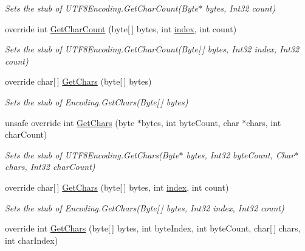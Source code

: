 \begin{DoxyCompactItemize}
\begin{DoxyCompactList}\small\item\em Sets the stub of U\-T\-F8\-Encoding.\-Get\-Char\-Count(\-Byte$\ast$ bytes, Int32 count)\end{DoxyCompactList}\item 
override int \hyperlink{class_system_1_1_text_1_1_fakes_1_1_stub_u_t_f8_encoding_af10ad81b078a4b38a30603140ae9aff4}{Get\-Char\-Count} (byte\mbox{[}$\,$\mbox{]} bytes, int \hyperlink{jquery-1_810_82-vsdoc_8js_a75bb12d1f23302a9eea93a6d89d0193e}{index}, int count)
\begin{DoxyCompactList}\small\item\em Sets the stub of U\-T\-F8\-Encoding.\-Get\-Char\-Count(\-Byte\mbox{[}$\,$\mbox{]} bytes, Int32 index, Int32 count)\end{DoxyCompactList}\item 
override char\mbox{[}$\,$\mbox{]} \hyperlink{class_system_1_1_text_1_1_fakes_1_1_stub_u_t_f8_encoding_ad5cbc984282ace8640a72464634a2d5b}{Get\-Chars} (byte\mbox{[}$\,$\mbox{]} bytes)
\begin{DoxyCompactList}\small\item\em Sets the stub of Encoding.\-Get\-Chars(\-Byte\mbox{[}$\,$\mbox{]} bytes)\end{DoxyCompactList}\item 
unsafe override int \hyperlink{class_system_1_1_text_1_1_fakes_1_1_stub_u_t_f8_encoding_a55f956660620b1ca922c4e45c2a1cc75}{Get\-Chars} (byte $\ast$bytes, int byte\-Count, char $\ast$chars, int char\-Count)
\begin{DoxyCompactList}\small\item\em Sets the stub of U\-T\-F8\-Encoding.\-Get\-Chars(\-Byte$\ast$ bytes, Int32 byte\-Count, Char$\ast$ chars, Int32 char\-Count)\end{DoxyCompactList}\item 
override char\mbox{[}$\,$\mbox{]} \hyperlink{class_system_1_1_text_1_1_fakes_1_1_stub_u_t_f8_encoding_a52ba3c5aa427f1e4d4de26b8b31b7637}{Get\-Chars} (byte\mbox{[}$\,$\mbox{]} bytes, int \hyperlink{jquery-1_810_82-vsdoc_8js_a75bb12d1f23302a9eea93a6d89d0193e}{index}, int count)
\begin{DoxyCompactList}\small\item\em Sets the stub of Encoding.\-Get\-Chars(\-Byte\mbox{[}$\,$\mbox{]} bytes, Int32 index, Int32 count)\end{DoxyCompactList}\item 
override int \hyperlink{class_system_1_1_text_1_1_fakes_1_1_stub_u_t_f8_encoding_a6480f8ebd65dccb94428c14b84fecbf0}{Get\-Chars} (byte\mbox{[}$\,$\mbox{]} bytes, int byte\-Index, int byte\-Count, char\mbox{[}$\,$\mbox{]} chars, int char\-Index)

\end{DoxyCompactItemize}
